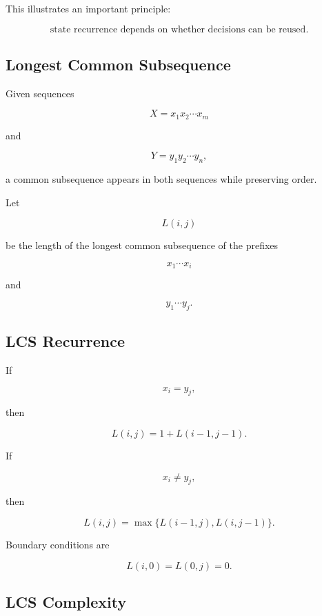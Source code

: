 This illustrates an important principle:

\[
\boxed{
\text{state recurrence depends on whether decisions can be reused}.
}
\]

\subsection{Longest Common Subsequence}
\label{subsec:longest-common-subsequence}

Given sequences

\[
X=x_1x_2\cdots x_m
\]

and

\[
Y=y_1y_2\cdots y_n,
\]

a common subsequence appears in both sequences while preserving order.

Let

\[
L(i,j)
\]

be the length of the longest common subsequence of the prefixes

\[
x_1\cdots x_i
\]

and

\[
y_1\cdots y_j.
\]

\subsection{LCS Recurrence}
\label{subsec:lcs-recurrence}

If

\[
x_i=y_j,
\]

then

\[
\boxed{
L(i,j)
=
1+L(i-1,j-1).
}
\]

If

\[
x_i\neq y_j,
\]

then

\[
\boxed{
L(i,j)
=
\max
\{
L(i-1,j),
L(i,j-1)
\}.
}
\]

Boundary conditions are

\[
\boxed{
L(i,0)=L(0,j)=0.
}
\]

\subsection{LCS Complexity}
\label{subsec:lcs-complexity}

